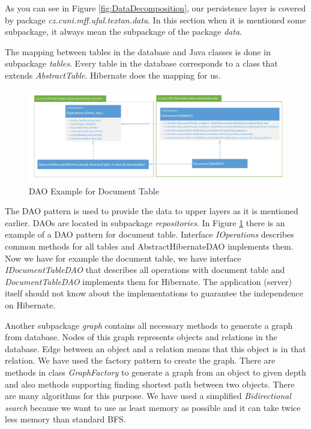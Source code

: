 As you can see in Figure \ref{fig:DataDecomposition}, our persistence layer is
covered by package \emph{cz.\-cuni.\-mff.\-ufal.\-textan.\-data}. In this section when it is
mentioned some subpackage, it always mean the subpackage of the package \emph{data}.

The mapping between tables in the database and Java classes is done in
subpackage \emph{tables}. Every table in the database corresponds to a class
that extends \emph{AbstractTable}. Hibernate does the mapping for us.

\begin{figure}[!htb]
        \centering
        \includegraphics[width=\textwidth]{Images/DatabaseDAO}
        \caption{DAO Example for Document Table}
        \label{fig:DatabaseDAO}
\end{figure}

The DAO pattern is used to provide the data to upper layers as it is mentioned
earlier. DAOs are located in subpackage \emph{repositories}.
In Figure \ref{fig:DatabaseDAO} there is an example of a
DAO pattern for document table. Interface \emph{IOperations} describes common
methods for all tables and AbstractHibernateDAO implements them. Now we have for
example the document table, we have interface \emph{IDocumentTableDAO} that
describes all operations with document table and \emph{DocumentTableDAO}
implements them for Hibernate. The application (server) itself should not know
about the implementations to guarantee the independence on Hibernate.

Another subpackage \emph{graph} contains all necessary methods to generate a
graph from database. Nodes of this graph represents objects and relations in
the database. Edge between an object and a relation means that this object is in
that relation. We have used the factory pattern to create the graph. There are
methods in class \emph{GraphFactory} to generate a graph from an object to given
depth and also methods supporting finding shortest path between two objects.	
There are many algorithms for this purpose. We have
used a simplified \emph{Bidirectional search} because we want to use as least memory as
possible and it can take twice less memory than standard BFS.

